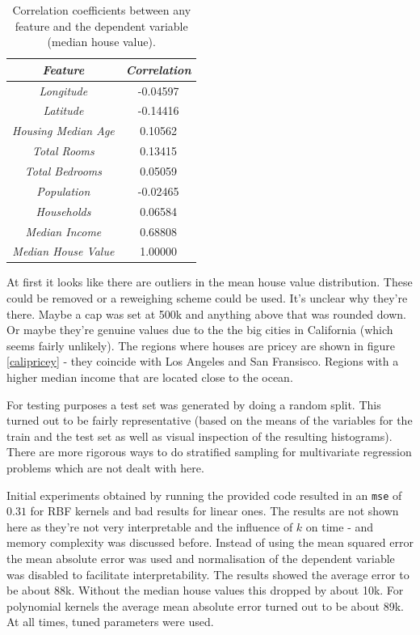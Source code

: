 \begingroup
\begin{table}
\centering
\begin{tabular}{c|c}
\textit{Feature} & \textit{Correlation}\\\hline
\textit{Longitude} & -0.04597\\
\textit{Latitude} & -0.14416\\
\textit{Housing Median Age} & 0.10562\\
\textit{Total Rooms} & 0.13415\\
\textit{Total Bedrooms} & 0.05059\\
\textit{Population} & -0.02465\\
\textit{Households} & 0.06584\\
\textit{Median Income} & 0.68808\\
\textit{Median House Value} & 1.00000
\end{tabular}
\caption{Correlation coefficients between any feature and the dependent variable (median house value).}
\label{calicorrcoef}
\end{table}

\par At first it looks like there are outliers in the mean house value distribution. These could be removed or a reweighing scheme could be used. It's unclear why they're there. Maybe a cap was set at 500k and anything above that was rounded down. Or maybe they're genuine values due to the the big cities in California (which seems fairly unlikely). The regions where houses are pricey are shown in figure \ref{calipricey} - they coincide with Los Angeles and San Fransisco. Regions with a higher median income that are located close to the ocean.

\par For testing purposes a test set was generated by doing a random split. This turned out to be fairly representative (based on the means of the variables for the train and the test set as well as visual inspection of the resulting histograms). There are more rigorous ways to do stratified sampling for multivariate regression problems which are not dealt with here.

\endgroup

\par Initial experiments obtained by running the provided code resulted in an \texttt{mse} of $0.31$ for RBF kernels and bad results for linear ones. The results are not shown here as they're not very interpretable and the influence of $k$ on time - and memory complexity was discussed before. Instead of using the mean squared error the mean absolute error was used and normalisation of the dependent variable was disabled to facilitate interpretability. The results showed the average error to be about 88k. Without the median house values this dropped by about 10k. For polynomial kernels the average mean absolute error turned out to be about 89k. At all times, tuned parameters were used.

